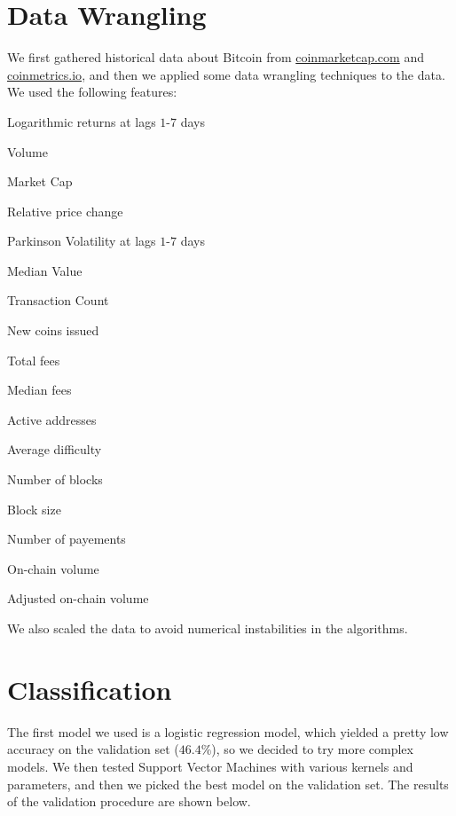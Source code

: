 \documentclass[12pt]{article}
\begin{document}
\section{Data Wrangling}
We first gathered historical data about Bitcoin from \url{coinmarketcap.com} and \url{coinmetrics.io}, and then we applied some data wrangling techniques to the data. We used the following features: 
\begin{list}{-}{ }
    \item Logarithmic returns at lags $1$-$7$ days
    \item Volume
    \item Market Cap
    \item Relative price change
    \item Parkinson Volatility at lags $1$-$7$ days
    \item Median Value
    \item Transaction Count
    \item New coins issued
    \item Total fees
    \item Median fees
    \item Active addresses
    \item Average difficulty
    \item Number of blocks
    \item Block size
    \item Number of payements
    \item On-chain volume
    \item Adjusted on-chain volume
\end{list}
We also scaled the data to avoid numerical instabilities in the algorithms.

\section{Classification}
The first model we used is a logistic regression model, which yielded a pretty low accuracy on the validation set ($46.4\%$),
so we decided to try more complex models.
We then tested Support Vector Machines with various kernels and parameters,
and then we picked the best model on the validation set.
The results of the validation procedure are shown below.
\end{document}
